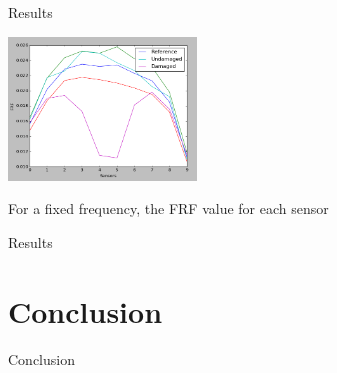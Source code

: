 \documentclass{beamer}
\begin{document}
\begin{frame}{Results}
\begin{center}
\includegraphics[width=5cm]{images/curve_damage.png}

For a fixed frequency, the FRF value for each sensor
\end{center}

\end{frame}

\begin{frame}{Results}
\end{frame}



\section{Conclusion}

\begin{frame}{Conclusion}
\end{frame}


  
\end{document}

